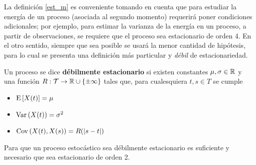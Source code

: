 
La definición \ref{est_m} es conveniente tomando en cuenta que para estudiar la energía de un proceso (asociada al segundo momento) requerirá poner condiciones adicionales; por ejemplo, para estimar la varianza de la energía en un proceso, a partir de observaciones, se requiere que el proceso sea estacionario de orden 4.
%
En el otro sentido, siempre que sea posible se usará la menor cantidad de hipótesis, para lo cual se presenta una definición más particular y \textit{débil} de estacionariedad.


\begin{definicion}%
Un proceso \xt se dice \textbf{débilmente estacionario} si existen constantes $\mu, \sigma \in \mathbb{R}$ y una función $R : \mathcal{T} \rightarrow \mathbb{R} \cup \{ \pm \infty \} $ tales que, para cualesquiera $t, s \in T$ se 
cumple
\begin{itemize}
\item $\mathrm{E}\left[ X(t) \right] = \mu$
\item $\mathrm{Var}\left( X(t) \right) = \sigma^{2}$
\item $\mathrm{Cov}\left( X(t),X(s) \right) = R(\left| s-t \right|)$
\end{itemize}
\end{definicion}

\begin{proposicion}
Para que un proceso estocástico \xt sea débilmente estacionario es suficiente y necesario que sea estacionario de orden 2.
\end{proposicion}

%

